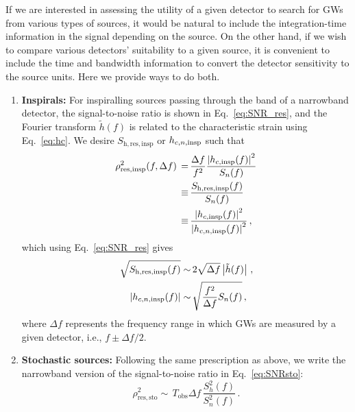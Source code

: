 \documentclass[11pt,a4paper]{article}
\begin{document}
If we are interested in assessing the utility of a given detector to search for GWs from various types of sources, it would be natural to include the integration-time information in the signal depending on the source. On the other hand, if we wish to compare various detectors' suitability to a given source, it is convenient to include the time and bandwidth information to convert the detector sensitivity to the source units. Here we provide ways to do both.

\begin{enumerate}
	\item \textbf{Inspirals:}
		For inspiralling sources passing through the band of a narrowband detector, the signal-to-noise ratio is shown in Eq.~\eqref{eq:SNR_res}, and the Fourier transform \(\tilde{h}(f)\) is related to the characteristic strain using Eq.~\eqref{eq:hc}.
		We desire \(S_\mathrm{h,res,insp}\) or \(h_{c,n,\rm insp}\) such that
		\begin{subequations}
			\begin{align}
				\rho^2_\mathrm{res,insp}(f,\Delta f) \,= \,& \frac{\Delta f}{f^2} \frac{\left|h_{c,\rm insp}(f)\right|^2}{S_n(f)}\\
				\equiv \, & \frac{S_\mathrm{h,res,insp}(f)}{S_n(f)} \\
				\equiv \,& \frac{\left|h_{c,\rm insp}(f)\right|^2}{\left|h_{c,n,\rm insp}(f)\right|^2} \,,
			\end{align}
			\label{eq:convert_narrorband_insp}
		\end{subequations}
which using Eq.~\eqref{eq:SNR_res} gives
		\begin{subequations}
			\begin{align}
				\sqrt{S_\mathrm{h,res,insp}(f)} \sim &\, 2\sqrt{\Delta f} \left|\tilde{h}(f)\right|  
				\,, 
				\\
				\left|h_{c,n,\rm insp}(f)\right| \sim&\, \sqrt{\frac{f^2}{\Delta f}S_n(f)} 
				\,,
			\end{align}
		\end{subequations}
  where \(\Delta f\) represents the frequency range in which GWs are measured by a given detector, i.e., \(f\pm\Delta f/2\).
	\item \textbf{Stochastic sources:}
		Following the same prescription as above, we write the narrowband version of the signal-to-noise ratio in Eq.~\eqref{eq:SNRsto}:
		\begin{equation}
			\rho^2_\mathrm{res,sto} \sim\, T_\mathrm{obs}  \Delta f\, \frac{S_h^2(f)}{S_n^2(f)}\label{eq:SNR_res_sto} \,.
		\end{equation}

\end{enumerate}
\end{document}
